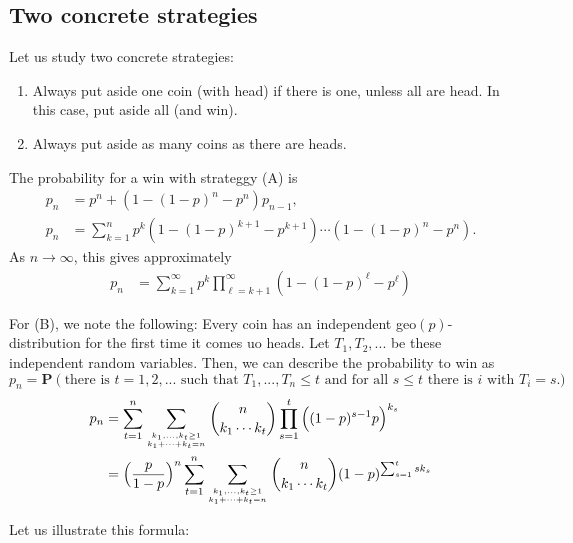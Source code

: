\documentclass{article}
\theoremstyle{definition}
\theoremstyle{step} \newtheorem{step}{Step}
\begin{document}
\subsection*{Two concrete strategies}
Let us study two concrete strategies:
\begin{enumerate}
  \item[(A)] Always put aside one coin (with head) if there is one,
    unless all are head. In this case, put aside all (and win).
  \item[(B)] Always put aside as many coins as there are heads.
\end{enumerate}
The probability for a win with strateggy (A) is
\begin{align*}
  p_n & = p^n + (1 - (1-p)^n - p^n)p_{n-1}, \\ p_n & = \sum_{k=1}^n
  p^k (1 - (1-p)^{k+1} - p^{k+1}) \cdots (1 - (1-p)^n - p^n).
\end{align*}
As $n\to\infty$, this gives approximately
\begin{align*}
  p_n & = \sum_{k=1}^\infty p^k \prod_{\ell = k+1}^\infty (1 -
  (1-p)^\ell - p^\ell)
\end{align*}

For (B), we note the following: Every coin has an independent
geo$(p)$-distribution for the first time it comes uo heads. Let $T_1,
T_2,...$ be these independent random variables. Then, we can describe
the probability to win as
$$ p_n = \mathbf P(\text{there is $t=1,2,...$ such that $T_1,...,T_n
  \leq t$ and for all $s\leq t$ there is $i$ with $T_i=s$}).$$
\begin{align*}
  p_n & = \sum_{t=1}^n \sum_{k_1,...,k_t \geq 1 \atop k_1 + \cdots + k_t
    = n} \binom{n}{k_1 \cdots k_t} \prod_{s=1}^t \Big((1-p)^{s-1}p\Big)^{k_s}
  \\ & = \Big( \frac{p}{1-p}\Big)^n \sum_{t=1}^n \sum_{k_1,...,k_t \geq 1 \atop k_1 + \cdots + k_t
    = n} \binom{n}{k_1 \cdots k_t} (1-p)^{\sum_{s=1}^t s k_s}
\end{align*}

Let us illustrate this formula:

~~
\end{document}
